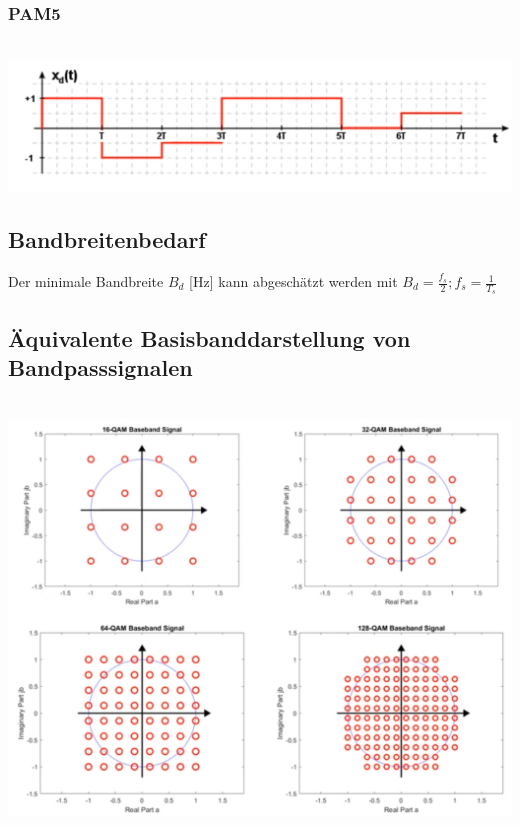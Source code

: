 \subsubsection{PAM5}\\
\includegraphics[width=0.6\columnwidth]{Images/pam5}


\subsection{Bandbreitenbedarf}
Der minimale Bandbreite $B_d$ [Hz] kann abgeschätzt werden mit $B_d = \frac{f_s}{2}; f_s = \frac{1}{T_s}$

\subsection{Äquivalente Basisbanddarstellung von Bandpasssignalen} \\
\includegraphics[width=\columnwidth]{Images/qam_basisdarstellung}
